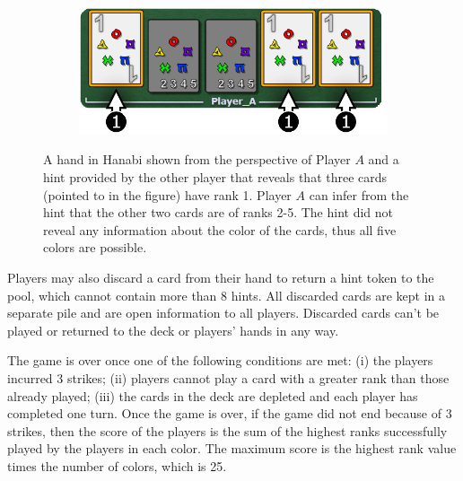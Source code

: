 \documentclass[letterpaper]{article} %
\begin{document}
\begin{figure}
     \centering
     \begin{subfigure}[b]{0.5\textwidth}
         \centering
         \includegraphics[width=\textwidth]{got hint.png}
     \end{subfigure}
     \caption{A hand in Hanabi shown from the perspective of Player $A$ and a hint provided by the other player that reveals  that three cards (pointed to in the figure) have rank 1. Player $A$ can infer from the hint that  the other two cards are of ranks 2-5. The hint did not reveal any information  about the color of the cards, thus all five colors are possible.}
     \hfill
     \label{hint example}
\end{figure}

Players may also discard a card from their hand to return a hint token to the pool, which cannot contain more than 8 hints. All discarded cards are kept in a separate pile and are open information to all players. Discarded cards can't be played or returned to the deck or players' hands in any way.

The game is over once one of the following conditions are met: (i) the players incurred 3 strikes; (ii) players cannot play a card with a greater rank than those already played; (iii) the cards in the  deck are depleted and each player has completed one turn.
Once the game is over, if the game did not end because of 3 strikes, then the score of the players is the sum of the highest ranks successfully played by the players in each color. The maximum score is the highest rank value times the  number of colors, which is 25.
\end{document}
